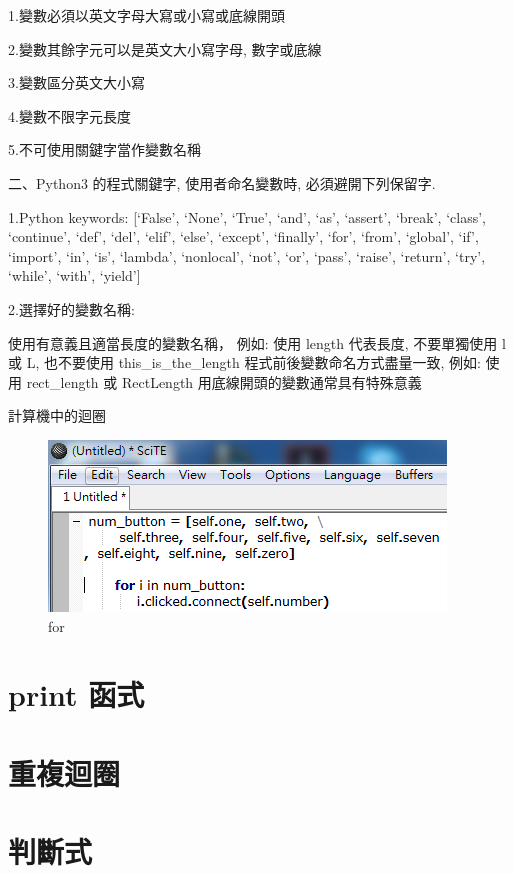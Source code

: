 \documentclass[12pt,,]{report}
\begin{document}
1.變數必須以英文字母大寫或小寫或底線開頭

2.變數其餘字元可以是英文大小寫字母, 數字或底線

3.變數區分英文大小寫

4.變數不限字元長度

5.不可使用關鍵字當作變數名稱

二、Python3 的程式關鍵字, 使用者命名變數時, 必須避開下列保留字.

1.Python keywords: {[}`False', `None', `True', `and', `as', `assert',
`break', `class', `continue', `def', `del', `elif', `else', `except',
`finally', `for', `from', `global', `if', `import', `in', `is',
`lambda', `nonlocal', `not', `or', `pass', `raise', `return', `try',
`while', `with', `yield'{]}

2.選擇好的變數名稱:

使用有意義且適當長度的變數名稱， 例如: 使用 length 代表長度,
不要單獨使用 l 或 L, 也不要使用 this\_is\_the\_length
程式前後變數命名方式盡量一致, 例如: 使用 rect\_length 或 RectLength
用底線開頭的變數通常具有特殊意義

計算機中的迴圈

\begin{figure}
\centering
\includegraphics{./tex2pdf.2656/106aca04d9385e9a9d229e278f54864f570d52d5.png}
\caption{for\label{fig:迴圈}}
\end{figure}

\hypertarget{print-ux51fdux5f0f}{%
\section{print 函式}\label{print-ux51fdux5f0f}}

\hypertarget{ux91cdux8907ux8ff4ux5708}{%
\section{重複迴圈}\label{ux91cdux8907ux8ff4ux5708}}

\hypertarget{ux5224ux65b7ux5f0f}{%
\section{判斷式}\label{ux5224ux65b7ux5f0f}}
\end{document}
